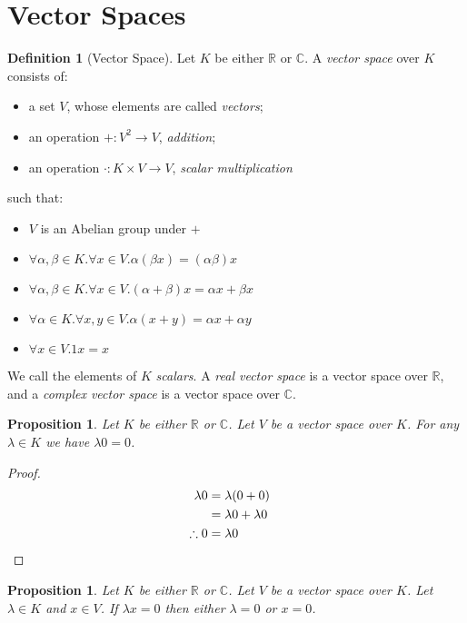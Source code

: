 \documentclass{book}
\let\qed\relax
\newtheorem{prop}[ax]{Proposition}
\theoremstyle{definition}
\newtheorem{df}[ax]{Definition}
\begin{document}
\section{Vector Spaces}

\begin{df}[Vector Space]
Let $K$ be either $\mathbb{R}$ or $\mathbb{C}$. A \emph{vector space} over $K$ consists of:
\begin{itemize}
\item a set $V$, whose elements are called \emph{vectors};
\item an operation $+ : V^2 \rightarrow V$, \emph{addition};
\item an operation $\cdot : K \times V \rightarrow V$, \emph{scalar multiplication}
\end{itemize}
such that:
\begin{itemize}
\item $V$ is an Abelian group under $+$
\item $\forall \alpha, \beta \in K. \forall x \in V. \alpha (\beta x) = (\alpha \beta) x$
\item $\forall \alpha, \beta \in K. \forall x \in V. (\alpha + \beta) x = \alpha x + \beta x$
\item $\forall \alpha \in K. \forall x,y \in V. \alpha (x + y) = \alpha x + \alpha y$
\item $\forall x \in V. 1x = x$
\end{itemize}

We call the elements of $K$ \emph{scalars}. A \emph{real vector space} is a vector space over $\mathbb{R}$, and a \emph{complex vector space} is a vector space over $\mathbb{C}$.
\end{df}

\begin{prop}
Let $K$ be either $\mathbb{R}$ or $\mathbb{C}$. Let $V$ be a vector space over $K$. For any $\lambda \in K$ we have $\lambda 0 = 0$.
\end{prop}

\begin{proof}
\pf\
\begin{align*}
\lambda 0 & = \lambda (0 + 0) \\
& = \lambda 0 + \lambda 0 \\
\therefore 0 & = \lambda 0 & \qed
\end{align*}
\end{proof}

\begin{prop}
Let $K$ be either $\mathbb{R}$ or $\mathbb{C}$. Let $V$ be a vector space over $K$. Let $\lambda \in K$ and $x \in V$. If $\lambda x = 0$ then either $\lambda = 0$ or $x = 0$.
\end{prop}
\end{document}
